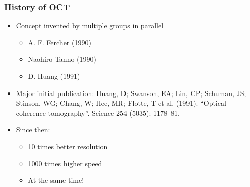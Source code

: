 \begin{frame}
    \frametitle{History of OCT}

    \begin{itemize}
        \item Concept invented by multiple groups in parallel
              \begin{itemize}
                  \item A. F. Fercher (1990)
                  \item Naohiro Tanno (1990)
                  \item D. Huang (1991)
              \end{itemize}
        \item Major initial publication: Huang, D; Swanson, EA; Lin, CP; Schuman, JS; Stinson, WG; Chang, W; Hee, MR; Flotte, T et al. (1991). ``Optical coherence tomography''. Science 254 (5035): 1178–81.

        \item Since then:
              \begin{itemize}
                  \item 10 times better resolution
                  \item 1000 times higher speed
                  \item At the same time!
              \end{itemize}
    \end{itemize}
\end{frame}


